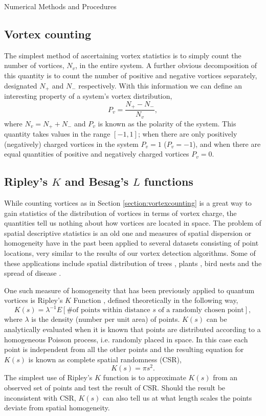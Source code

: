 \begin{chapter}{\label{cha:numerics}Numerical Methods and Procedures}
  \subsection{\label{section:vortexcounting} Vortex counting}
  The simplest method of ascertaining vortex statistics is to simply count the number of vortices, $N_v$, in the entire system. A further obvious decomposition of this quantity is to count the number of positive and negative vortices separately, designated $N_+$ and $N_-$ respectively. With this information we can define an interesting property of a system's vortex distribution,
  \begin{equation}
    P_v = \frac{N_+ - N_-}{N_v},
  \end{equation}
  where $N_v = N_+ + N_-$ and $P_v$ is known as the polarity of the system. This quantity takes values in the range $[-1,1]$; when there are only positively (negatively) charged vortices in the system $P_v=1$ ($P_v=-1$), and when there are equal quantities of positive and negatively charged vortices $P_v=0$.
  \subsection{\label{section:ripleysk} Ripley's $K$ and Besag's $L$ functions }
  While counting vortices as in Section \ref{section:vortexcounting} is a great way to gain statistics of the distribution of vortices in terms of vortex charge, the quantities tell us nothing about how vortices are located in space. The problem of spatial descriptive statistics is an old one and measures of spatial dispersion or homogeneity have in the past been applied to several datasets consisting of point locations, very similar to the results of our vortex detection algorithms. Some of these applications include spatial distribution of trees \cite{duncan_1993,peterson_1995,stoyan_2000}, plants \cite{stamp_1990}, bird nests \cite{gaines_2000} and the spread of disease \cite{diggle_1991}.


  One such measure of homogeneity that has been previously applied to quantum vortices \cite{bagg12} is Ripley's $K$ Function \cite{dixon_2002}, defined theoretically in the following way,
  \begin{equation}\label{eq:ripleysktheory}
    K(s) = \lambda^{-1}E[\text{\# of points within distance $s$ of a randomly chosen point}],
  \end{equation}
  where $\lambda$ is the density (number per unit area) of points. $K(s)$ can be analytically evaluated when it is known that points are distributed according to a homogeneous Poisson process, i.e. randomly placed in space. In this case each point is independent from all the other points and the resulting equation for $K(s)$ is known as complete spatial randomness (CSR),
  \begin{equation}\label{eq:ripleyskcsr}
    K(s) = \pi s^2.
  \end{equation}
  The simplest use of Ripley's $K$ function is to approximate $K(s)$ from an observed set of points and test the result of CSR. Should the result be inconsistent with CSR, $K(s)$ can also tell us at what length scales the points deviate from spatial homogeneity.


\end{chapter}
